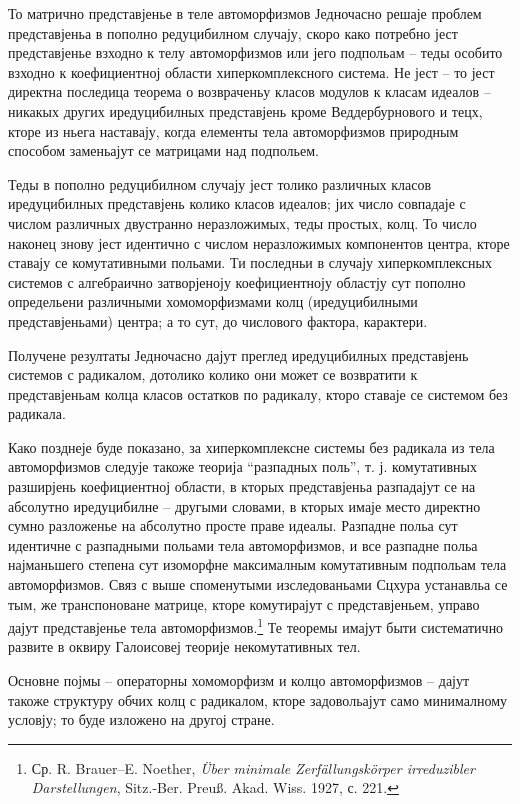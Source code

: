 ﻿\documentclass[11pt]{article}
\begin{document}
То матрично представјенье в теле автоморфизмов Једночасно решаје проблем представјеньа в пополно редуцибилном случају, скоро како потребно јест представјенье взходно к телу автоморфизмов или јего подпольам -- теды особито взходно к коефициентној области хиперкомплексного система. Не јест -- то јест директна последица теорема о возвраченьу класов модулов к класам идеалов -- никакых других иредуцибилных представјень кроме Веддербурнового и тецх, кторе из ньега наставају, когда елементы тела автоморфизмов природным способом заменьајут се матрицами над подпольем.

Теды в пополно редуцибилном случају јест толико различных класов иредуцибилных представјень колико класов идеалов; јих число совпадаје с числом различных двустранно неразложимых, теды простых, колц. То число наконец знову јест идентично с числом неразложимых компонентов центра, кторе ставају се комутативными польами. Ти последньи в случају хиперкомплексных системов с алгебраично затворјеноју коефициентноју областју сут пополно определьени различными хомоморфизмами колц (иредуцибилными представјеньами) центра; а то сут, до числового фактора, карактери.

Получене резултаты Једночасно дајут преглед иредуцибилных представјень системов с радикалом, дотолико колико они может се возвратити к представјеньам колца класов остатков по радикалу, кторо ставаје се системом без радикала.

Како позднеје буде показано, за хиперкомплексне системы без радикала из тела автоморфизмов следује такоже теорија “разпадных поль”, т. ј. комутативных разширјень коефициентној области, в кторых представјеньа разпадајут се на абсолутно иредуцибилне -- другыми словами, в кторых имаје место директно сумно разложенье на абсолутно просте праве идеалы. Разпадне польа сут идентичне с разпадными польами тела автоморфизмов, и все разпадне польа најманьшего степена сут изоморфне максималным комутативным подпольам тела автоморфизмов. Связ с выше споменутыми изследованьами Сцхура устанавльа се тым, же транспоноване матрице, кторе комутирајут с представјеньем, управо дајут представјенье тела автоморфизмов.\footnote{Ср. R. Brauer--E. Noether, \emph{Über minimale Zerfällungskörper irreduzibler Darstellungen}, Sitz.-Ber. Preuß. Akad. Wiss. 1927, с. 221.} Те теоремы имајут быти систематично развите в оквиру Галоисовеј теорије некомутативных тел.

Основне појмы -- операторны хомоморфизм и колцо автоморфизмов -- дајут такоже структуру обчих колц с радикалом, кторе задовольајут само минималному условју; то буде изложено на другој стране.
\end{document}
